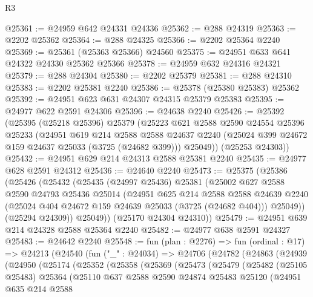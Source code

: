 \begin{lexlean}{R3}
\begin{coremodule}
@25361 := @24959 @642 @24331 @24336
@25362 := @288 @24319
@25363 := @2202 @25362
@25364 := @288 @24325
@25366 := @2202 @25364 @2240
@25369 := @25361 (@25363 @25366) @24560
@25375 := @24951 @633 @641 @24322 @24330 @25362 @25366
@25378 := @24959 @632 @24316 @24321
@25379 := @288 @24304
@25380 := @2202 @25379
@25381 := @288 @24310
@25383 := @2202 @25381 @2240
@25386 := @25378 (@25380 @25383) @25362
@25392 := @24951 @623 @631 @24307 @24315 @25379 @25383
@25395 := @24977 @622 @2591 @24306
@25396 := @24638 @2240
@25426 := @25392
    (@25395
      (@25218 @25396)
      @25379
      (@25223
        @621
        @2588
        @2590
        @24554
        @25396
        @25233
        (@24951
          @619
          @214
          @2588
          @2588
          @24637
          @2240
          (@25024 @399 @24672 @159 @24637 @25033 (@3725 (@24682 @399)))
          @25049))
      (@25253 @24303))
@25432 := @24951 @629 @214 @24313 @2588 @25381 @2240
@25435 := @24977 @628 @2591 @24312
@25436 := @24640 @2240
@25473 := @25375
    (@25386
      (@25426
        (@25432
          (@25435
            (@24997 @25436)
            @25381
            (@25002
              @627
              @2588
              @2590
              @24793
              @25436
              @25014
              (@24951
                @625
                @214
                @2588
                @2588
                @24639
                @2240
                (@25024 @404 @24672 @159 @24639 @25033 (@3725 (@24682 @404)))
                @25049))
            (@25294 @24309))
          @25049))
      (@25170 @24304 @24310))
@25479 := @24951 @639 @214 @24328 @2588 @25364 @2240
@25482 := @24977 @638 @2591 @24327
@25483 := @24642 @2240
@25548 := fun (plan : @2276) =>
  fun (ordinal : @17) =>
  @24213
    (@24540
      (fun ("_" : @24034) =>
      @24706
        (@24782
          (@24863
            (@24939
              (@24950
                (@25174
                  (@25352
                    (@25358
                      (@25369
                        (@25473
                          (@25479
                            (@25482
                              (@25105 @25483)
                              @25364
                              (@25110
                                @637
                                @2588
                                @2590
                                @24874
                                @25483
                                @25120
                                (@24951
                                  @635
                                  @214
                                  @2588

\end{coremodule}
\end{lexlean}
